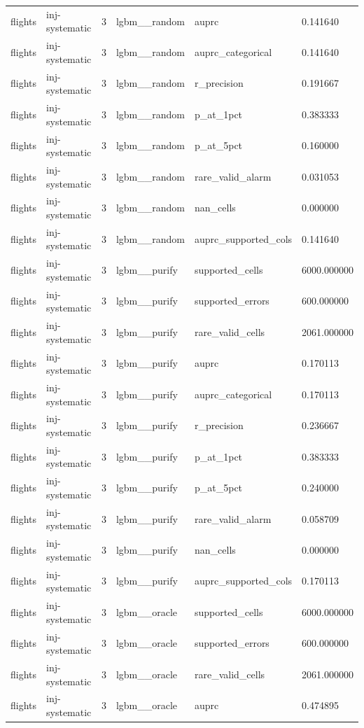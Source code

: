 \begin{tabular}{llllll}
flights & inj-systematic & 3 & lgbm\_\_random & auprc & 0.141640 \\
flights & inj-systematic & 3 & lgbm\_\_random & auprc\_categorical & 0.141640 \\
flights & inj-systematic & 3 & lgbm\_\_random & r\_precision & 0.191667 \\
flights & inj-systematic & 3 & lgbm\_\_random & p\_at\_1pct & 0.383333 \\
flights & inj-systematic & 3 & lgbm\_\_random & p\_at\_5pct & 0.160000 \\
flights & inj-systematic & 3 & lgbm\_\_random & rare\_valid\_alarm & 0.031053 \\
flights & inj-systematic & 3 & lgbm\_\_random & nan\_cells & 0.000000 \\
flights & inj-systematic & 3 & lgbm\_\_random & auprc\_supported\_cols & 0.141640 \\
flights & inj-systematic & 3 & lgbm\_\_purify & supported\_cells & 6000.000000 \\
flights & inj-systematic & 3 & lgbm\_\_purify & supported\_errors & 600.000000 \\
flights & inj-systematic & 3 & lgbm\_\_purify & rare\_valid\_cells & 2061.000000 \\
flights & inj-systematic & 3 & lgbm\_\_purify & auprc & 0.170113 \\
flights & inj-systematic & 3 & lgbm\_\_purify & auprc\_categorical & 0.170113 \\
flights & inj-systematic & 3 & lgbm\_\_purify & r\_precision & 0.236667 \\
flights & inj-systematic & 3 & lgbm\_\_purify & p\_at\_1pct & 0.383333 \\
flights & inj-systematic & 3 & lgbm\_\_purify & p\_at\_5pct & 0.240000 \\
flights & inj-systematic & 3 & lgbm\_\_purify & rare\_valid\_alarm & 0.058709 \\
flights & inj-systematic & 3 & lgbm\_\_purify & nan\_cells & 0.000000 \\
flights & inj-systematic & 3 & lgbm\_\_purify & auprc\_supported\_cols & 0.170113 \\
flights & inj-systematic & 3 & lgbm\_\_oracle & supported\_cells & 6000.000000 \\
flights & inj-systematic & 3 & lgbm\_\_oracle & supported\_errors & 600.000000 \\
flights & inj-systematic & 3 & lgbm\_\_oracle & rare\_valid\_cells & 2061.000000 \\
flights & inj-systematic & 3 & lgbm\_\_oracle & auprc & 0.474895 \\

\end{tabular}
